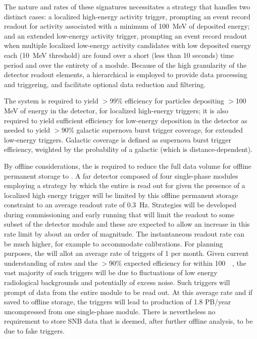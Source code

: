 The nature and rates of these signatures necessitates a  strategy that handles two
distinct cases: a localized high-energy activity trigger, prompting an event record readout for
activity associated with a minimum of \SI{100}{MeV} of deposited energy; and an extended low-energy
activity trigger, prompting an event record readout when multiple localized low-energy activity
candidates with low deposited energy each (\SI{10}{MeV} threshold) are found over a short (less than
10 seconds) time period and over the entirety of a \nominalmodsize  module. Because of the high
granularity of the detector readout elements, a hierarchical  is employed to
provide data processing and triggering, and facilitate optional data reduction and filtering. 

The   system is required to yield $>$99\% efficiency for particles depositing $>$100 MeV
of energy in the detector, for localized high-energy triggers; it is also required to yield
sufficient efficiency for low-energy deposition in the detector as needed to yield $>$90\% galactic
supernova burst trigger coverage, for extended low-energy triggers. Galactic coverage is defined as
supernova burst trigger efficiency, weighted by the probability of a galactic  (which
is  distance-dependent).

By offline considerations, the  is required to reduce the
full  data volume for offline permanent storage to  \offsitepbpy.
A far detector composed of four single-phase modules employing a
strategy by which the entire  is read out for \spreadout
given the presence of a localized high energy trigger will be limited
by this offline permanent storage constraint to an average readout rate of \SI{0.3}{\hertz}. 
Strategies will be developed during commissioning and early running that will limit the readout to some subset of the detector module and these are expected to allow an increase in this rate limit by about an order of magnitude.
The instantaneous readout rate can be much higher, for example to accommodate calibrations.
For planning purposes, the  will allot an average rate of  triggers of 1 per month.
Given current understanding of  rates and the $>$90\% expected efficiency for  within \SI{100}{\kilo\parsec}, the vast majority of such triggers will be due to fluctuations of low energy radiological backgrounds and potentially of excess noise.
Such triggers will prompt \snbtime of data from the entire module to be read out.
At this average rate and if saved to offline storage, the 
triggers will lead to production of 1.8 PB/year uncompressed from one
single-phase module. There is nevertheless no requirement to store SNB
data that is deemed, after further offline analysis, to be due to fake triggers.

